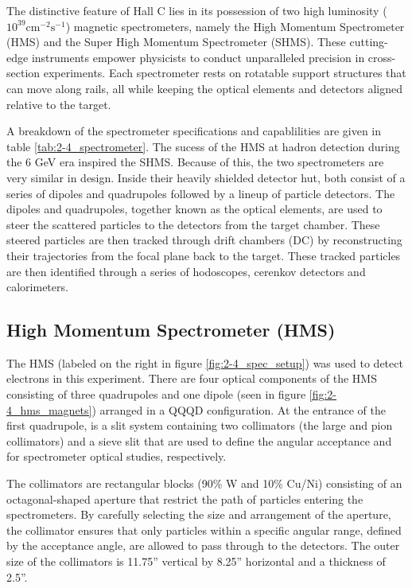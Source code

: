 \documentclass[
]{report}
\begin{document}
The distinctive feature of Hall C lies in its possession of two high
luminosity (\(10^{39}\text{cm}^{-2}\text{s}^{-1}\)) magnetic
spectrometers, namely the High Momentum Spectrometer (HMS) and the Super
High Momentum Spectrometer (SHMS). These cutting-edge instruments
empower physicists to conduct unparalleled precision in cross-section
experiments. Each spectrometer rests on rotatable support structures
that can move along rails, all while keeping the optical elements and
detectors aligned relative to the target.



A breakdown of the spectrometer specifications and capablilities are
given in table \ref{tab:2-4_spectrometer}. The sucess of the HMS at
hadron detection during the 6 GeV era inspired the SHMS. Because of
this, the two spectrometers are very similar in design. Inside their
heavily shielded detector hut, both consist of a series of dipoles and
quadrupoles followed by a lineup of particle detectors. The dipoles and
quadrupoles, together known as the optical elements, are used to steer
the scattered particles to the detectors from the target chamber. These
steered particles are then tracked through drift chambers (DC) by
reconstructing their trajectories from the focal plane back to the
target. These tracked particles are then identified through a series of
hodoscopes, cerenkov detectors and calorimeters.



\hypertarget{high-momentum-spectrometer-hms}{%
\subsection{High Momentum Spectrometer
(HMS)}\label{high-momentum-spectrometer-hms}}

The HMS (labeled on the right in figure \ref{fig:2-4_spec_setup}) was
used to detect electrons in this experiment. There are four optical
components of the HMS consisting of three quadrupoles and one dipole
(seen in figure \ref{fig:2-4_hms_magnets}) arranged in a QQQD
configuration. At the entrance of the first quadrupole, is a slit system
containing two collimators (the large and pion collimators) and a sieve
slit that are used to define the angular acceptance and for spectrometer
optical studies, respectively.



The collimators are rectangular blocks (90\% W and 10\% Cu/Ni)
consisting of an octagonal-shaped aperture that restrict the path of
particles entering the spectrometers. By carefully selecting the size
and arrangement of the aperture, the collimator ensures that only
particles within a specific angular range, defined by the acceptance
angle, are allowed to pass through to the detectors. The outer size of
the collimators is 11.75'' vertical by 8.25'' horizontal and a thickness
of 2.5''.
\end{document}
